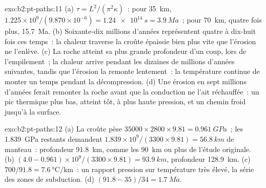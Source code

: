 \begin{solution}{exo:b2:pt-paths:11}
(a) $\tau = L^2/(\pi^2\kappa)$~: pour \qty{35}{km}, $1.225\times10^9/(9.870\times10^{-6}) =
\qty{1.24e14}{s} = \qty{3.9}{Ma}$~; pour \qty{70}{km}, quatre fois plus,
\qty{15.7}{Ma}. (b) Soixante-dix millions d'années représentent quatre à dix-huit fois ces temps~: la chaleur
traverse la croûte épaissie bien plus vite que l'érosion ne l'enlève. (c) La roche
atteint sa plus grande profondeur d'un coup, lors de l'empilement~; la chaleur arrive pendant les
dizaines de millions d'années suivantes, tandis que l'érosion la remonte lentement~: la température continue de
monter un temps pendant la décompression. (d) Une érosion en sept millions d'années ferait
remonter la roche avant que la conduction ne l'ait réchauffée~: un pic thermique plus bas, atteint
tôt, à plus haute pression, et un chemin froid jusqu'à la surface.
\end{solution}

\begin{solution}{exo:b2:pt-paths:12}
(a) La croûte pèse $35000\times2800\times9.81 = \qty{0.961}{GPa}$~; les
\qty{1.839}{GPa} restants demandent $1.839\times10^9/(3300\times9.81) = \qty{56.8}{km}$ de manteau~: profondeur
\qty{91.8}{km}, comme les \qty{90}{km} ou plus de l'étude originale. (b) $(4.0 -
0.961)\times10^9/(3300\times9.81) = \qty{93.9}{km}$, profondeur \qty{128.9}{km}.
(c) $700/91.8 = \qty{7.6}{\celsius\per\km}$~: un rapport pression sur température très élevé, la série
des zones de subduction. (d) $(91.8 - 35)/34 = \qty{1.7}{Ma}$.
\end{solution}

